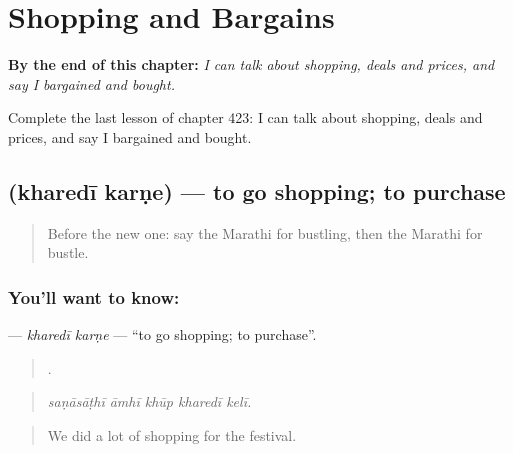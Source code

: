 
\chapter{Shopping and Bargains}
\label{ch:mr-shopping-and-bargains}

\begin{chapteropening}
\textbf{By the end of this chapter:} \emph{I can talk about shopping, deals and prices, and say I bargained and bought.}

Complete the last lesson of chapter 423: I can talk about shopping, deals and prices, and say I bargained and bought.
\end{chapteropening}

\section[\texorpdfstring{\mr{खरेदी} \mr{करणे} (kharedī karṇe)}{खरेदी करणे (kharedī karṇe)}]{  (kharedī karṇe) — to go shopping; to purchase}

\label{lesson:MR-C423-kharedi-karne}



\begin{quote}
Before the new one: say the Marathi for bustling, then the Marathi for bustle.
\end{quote}

\subsection*{You'll want to know:  }
\textbf{ } — \emph{kharedī karṇe} — \textquotedblleft{}to go shopping; to purchase\textquotedblright{}.

\begin{quote}
    .
\end{quote}

\begin{quote}
\emph{saṇāsāṭhī āmhī khūp kharedī kelī.}
\end{quote}

\begin{quote}
We did a lot of shopping for the festival.
\end{quote}

